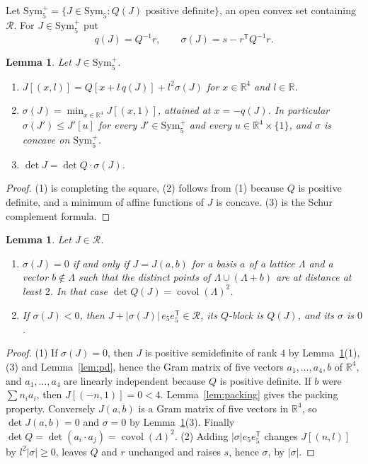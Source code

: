 \documentclass[11pt,reqno]{amsart}
\renewcommand{\_}{\origunderscore\allowbreak}
\numberwithin{equation}{section}
\theoremstyle{plain}
\newtheorem{lem}[thm]{Lemma}
\theoremstyle{definition}
\theoremstyle{remark}
\newcommand{\R}{\mathbb{R}}
\newcommand{\Rk}{\mathcal{R}}
\newcommand{\Sym}{\mathrm{Sym}}
\newcommand{\covol}{\operatorname{covol}}
\begin{document}
Let $\Sym_5^+=\{J\in\Sym_5:Q(J)\text{ positive definite}\}$, an open convex set containing $\Rk$. For $J\in\Sym_5^+$ put
\[
q(J)=Q^{-1}r,\qquad \sigma(J)=s-r^{\mathsf T}Q^{-1}r .
\]

\begin{lem}\label{lem:sigma}
Let $J\in\Sym_5^+$.
\begin{enumerate}
\item $J[(x,l)]=Q[x+l\,q(J)]+l^2\sigma(J)$ for $x\in\R^4$ and $l\in\R$.
\item $\sigma(J)=\min_{x\in\R^4}J[(x,1)]$, attained at $x=-q(J)$. In particular $\sigma(J')\le J'[u]$ for every $J'\in\Sym_5^+$ and every $u\in\R^4\times\{1\}$, and $\sigma$ is concave on $\Sym_5^+$.
\item $\det J=\det Q\cdot\sigma(J)$.
\end{enumerate}
\end{lem}

\begin{proof}
(1) is completing the square, (2) follows from (1) because $Q$ is positive definite, and a minimum of affine functions of $J$ is concave. (3) is the Schur complement formula.
\end{proof}

\begin{lem}\label{lem:rank4}
Let $J\in\Rk$.
\begin{enumerate}
\item $\sigma(J)=0$ if and only if $J=J(a,b)$ for a basis $a$ of a lattice $\Lambda$ and a vector $b\notin\Lambda$ such that the distinct points of $\Lambda\cup(\Lambda+b)$ are at distance at least $2$. In that case $\det Q(J)=\covol(\Lambda)^2$.
\item If $\sigma(J)<0$, then $J+|\sigma(J)|\,e_5e_5^{\mathsf T}\in\Rk$, its $Q$-block is $Q(J)$, and its $\sigma$ is $0$.
\end{enumerate}
\end{lem}

\begin{proof}
(1) If $\sigma(J)=0$, then $J$ is positive semidefinite of rank $4$ by Lemma~\ref{lem:sigma}(1), (3) and Lemma~\ref{lem:pd}, hence the Gram matrix of five vectors $a_1,\dots,a_4,b$ of $\R^4$, and $a_1,\dots,a_4$ are linearly independent because $Q$ is positive definite. If $b$ were $\sum n_ia_i$, then $J[(-n,1)]=0<4$. Lemma~\ref{lem:packing} gives the packing property. Conversely $J(a,b)$ is a Gram matrix of five vectors in $\R^4$, so $\det J(a,b)=0$ and $\sigma=0$ by Lemma~\ref{lem:sigma}(3). Finally $\det Q=\det(a_i\cdot a_j)=\covol(\Lambda)^2$.
(2) Adding $|\sigma|e_5e_5^{\mathsf T}$ changes $J[(n,l)]$ by $l^2|\sigma|\ge0$, leaves $Q$ and $r$ unchanged and raises $s$, hence $\sigma$, by $|\sigma|$.
\end{proof}
\end{document}

